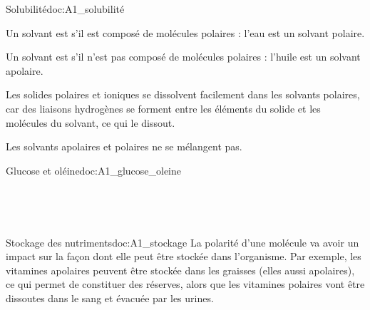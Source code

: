 \begin{doc}{Solubilité}{doc:A1_solubilité}
  \begin{listePoints}
    \item Un solvant est  s'il est composé de molécules polaires : l'eau est un solvant polaire.
    \item Un solvant est  s'il n'est pas composé de molécules polaires : l'huile est un solvant apolaire.
  \end{listePoints}
  Les solides polaires et ioniques se dissolvent facilement dans les solvants polaires, car des liaisons hydrogènes se forment entre les éléments du solide et les molécules du solvant, ce qui le dissout.

  Les solvants apolaires et polaires ne se mélangent pas.
\end{doc}

\begin{doc}{Glucose et oléine}{doc:A1_glucose_oleine}
  \begin{multicols}{2}
    \centering
    {\small
    } \\[6pt]

    {\small
    } \\[6pt]
  \end{multicols}
\end{doc}





\begin{doc}{Stockage des nutriments}{doc:A1_stockage}
  La polarité d'une molécule va avoir un impact sur la façon dont elle peut être stockée dans l'organisme.
  Par exemple, les vitamines apolaires peuvent être stockée dans les graisses (elles aussi apolaires), ce qui permet de constituer des réserves, alors que les vitamines polaires vont être dissoutes dans le sang et évacuée par les urines.
\end{doc}